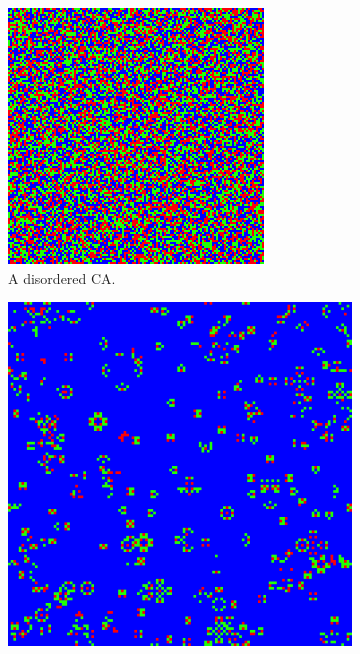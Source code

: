 \begin{figure}[htbp]
  \centering
\begin{subfigure}[b]{.4\linewidth}
  \centering
  \includegraphics[width=\linewidth]{figures/disord2.png}
  \caption{A disordered \acl{CA}.}
 \label{fig:disordered_sys}
\end{subfigure}
\hspace{30pt}
\begin{subfigure}[b]{.4\linewidth}
  \centering
  \includegraphics[width=\linewidth]{figures/micro4.png}

\end{subfigure}
\end{figure}
